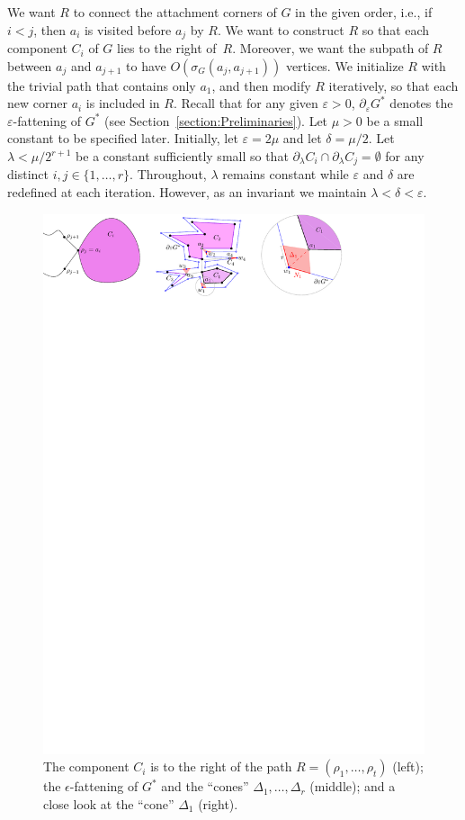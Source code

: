 \documentclass{patmorin}
\begin{document}
We want $R$ to connect the attachment corners of $G$ in the given order, i.e., if $i < j$, then $a_i$ is visited before $a_j$ by $R$. We want to construct $R$ so that each component $C_i$ of $G$ lies to the right of~$R$.
Moreover, we want the subpath of $R$ between $a_j$ and $a_{j+1}$ to have $O(\sigma_G(a_j, a_{j+1}))$ vertices. 
We initialize $R$ with the trivial path that contains only $a_1$, and then modify $R$ iteratively, so that each new corner $a_i$ is included in $R$.
Recall that  for any given $\varepsilon >0$, $\partial_\varepsilon G^*$ denotes the $\varepsilon$-fattening of $G^*$ (see Section~\ref{section:Preliminaries}).
Let $\mu>0$ be a small constant to be specified later.
Initially, let $\varepsilon = 2\mu$ and let $\delta = \mu/2$. Let $\lambda < \mu/2^{r+1}$ be a constant sufficiently small so that $\partial_\lambda C_i \cap \partial_\lambda C_j = \emptyset$ for any distinct $i,j\in\{1,\ldots,r\}$.
Throughout, $\lambda$ remains constant while $\varepsilon$ and $\delta$ are redefined at each iteration. However, as an invariant we maintain $\lambda < \delta < \varepsilon$.

\begin{figure}[h!]
\centering
\includegraphics[width=1\textwidth]{img/Neighborhood.pdf}
\caption{\small The component $C_i$ is to the right of the path $R=(\rho_1,\ldots,\rho_t)$ (left); the $\epsilon$-fattening of $G^*$ and the ``cones'' $\Delta_1,\ldots,\Delta_r$ (middle); and a close look at the ``cone'' $\Delta_1$ (right).}
\label{fig:Neighborhood}
\end{figure}
\end{document}
